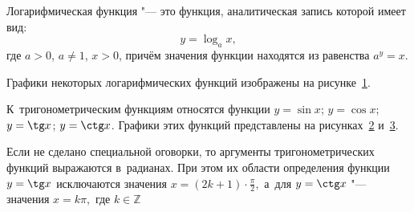 Логарифмическая функция "--- это функция, аналитическая запись которой
имеет вид:
\begin{equation*}
y = \log_{a} x,
\end{equation*}
где $a > 0$, $a \ne 1$, $x > 0$, причём значения функции находятся из равенства
$\displaystyle a^{y} = x$.

Графики некоторых логарифмических функций изображены на рисунке~\ref{fig_1_2_2-3}.

\begin{figure}\label{fig_1_2_2-3}
\end{figure}

\begin{figure}\label{fig_1_2_4}
\end{figure}

К~тригонометрическим функциям относятся функции 
$y = \sin x$; $y = \cos x$; $y = \tg x$; $y = \ctg x$.
Графики этих функций представлены на рисунках~\ref{fig_1_2_4} и~\ref{fig_1_2_5}.

\begin{figure}\label{fig_1_2_5}
\end{figure}

\begin{Note}
Если не сделано специальной оговорки, то аргументы тригонометрических функций
выражаются в~радианах. При этом их области определения функции $y = \tg x$
исключаются значения $\displaystyle x = (2k +1) \cdot \frac{\pi}{2},$
а~для $y = \ctg x$ "--- значения $x = k\pi,$ где $k \in \mathbb{Z}$
\end{Note}
